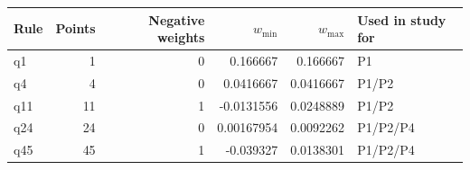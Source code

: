 \begin{tabularx}{\textwidth}{@{}lrrrrX@{}}
\toprule
Rule & Points & Negative weights & $w_{\min}$ & $w_{\max}$ & Used in study for \\
\midrule
q1 & 1 & 0 & 0.166667 & 0.166667 & P1 \\
q4 & 4 & 0 & 0.0416667 & 0.0416667 & P1/P2 \\
q11 & 11 & 1 & -0.0131556 & 0.0248889 & P1/P2 \\
q24 & 24 & 0 & 0.00167954 & 0.0092262 & P1/P2/P4 \\
q45 & 45 & 1 & -0.039327 & 0.0138301 & P1/P2/P4 \\
\bottomrule
\end{tabularx}
